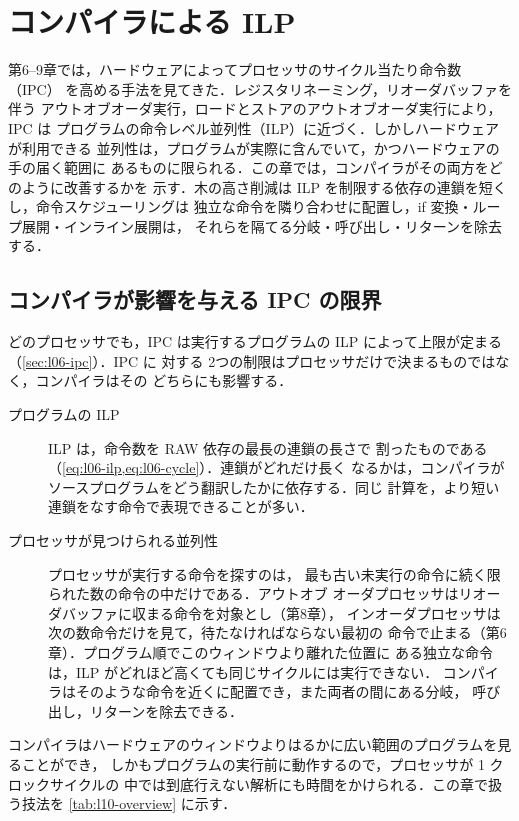 \documentclass[../main.tex]{subfiles}
\begin{document}
\chapter{コンパイラによる ILP}

第6--9章では，ハードウェアによってプロセッサのサイクル当たり命令数（IPC）
を高める手法を見てきた．レジスタリネーミング，リオーダバッファを伴う
アウトオブオーダ実行，ロードとストアのアウトオブオーダ実行により，IPC は
プログラムの命令レベル並列性（ILP）に近づく．しかしハードウェアが利用できる
並列性は，プログラムが実際に含んでいて，かつハードウェアの手の届く範囲に
あるものに限られる．この章では，コンパイラがその両方をどのように改善するかを
示す．木の高さ削減は ILP を制限する依存の連鎖を短くし，命令スケジューリングは
独立な命令を隣り合わせに配置し，if 変換・ループ展開・インライン展開は，
それらを隔てる分岐・呼び出し・リターンを除去する．

\section{コンパイラが影響を与える IPC の限界}
\label{sec:l10-limits}

どのプロセッサでも，IPC は実行するプログラムの ILP によって上限が定まる
（\cref{sec:l06-ipc}）．IPC に
対する 2つの制限はプロセッサだけで決まるものではなく，コンパイラはその
どちらにも影響する．
\begin{description}
  \item[プログラムの ILP] ILP は，命令数を RAW 依存の最長の連鎖の長さで
    割ったものである（\cref{eq:l06-ilp,eq:l06-cycle}）．連鎖がどれだけ長く
    なるかは，コンパイラがソースプログラムをどう翻訳したかに依存する．同じ
    計算を，より短い連鎖をなす命令で表現できることが多い．
  \item[プロセッサが見つけられる並列性] プロセッサが実行する命令を探すのは，
    最も古い未実行の命令に続く限られた数の命令の中だけである．アウトオブ
    オーダプロセッサはリオーダバッファに収まる命令を対象とし（第8章），
    インオーダプロセッサは次の数命令だけを見て，待たなければならない最初の
    命令で止まる（第6章）．プログラム順でこのウィンドウより離れた位置に
    ある独立な命令は，ILP がどれほど高くても同じサイクルには実行できない．
    コンパイラはそのような命令を近くに配置でき，また両者の間にある分岐，
    呼び出し，リターンを除去できる．
\end{description}
コンパイラはハードウェアのウィンドウよりはるかに広い範囲のプログラムを見ることができ，
しかもプログラムの実行前に動作するので，プロセッサが 1 クロックサイクルの
中では到底行えない解析にも時間をかけられる．この章で扱う技法を
\cref{tab:l10-overview} に示す．
\end{document}
